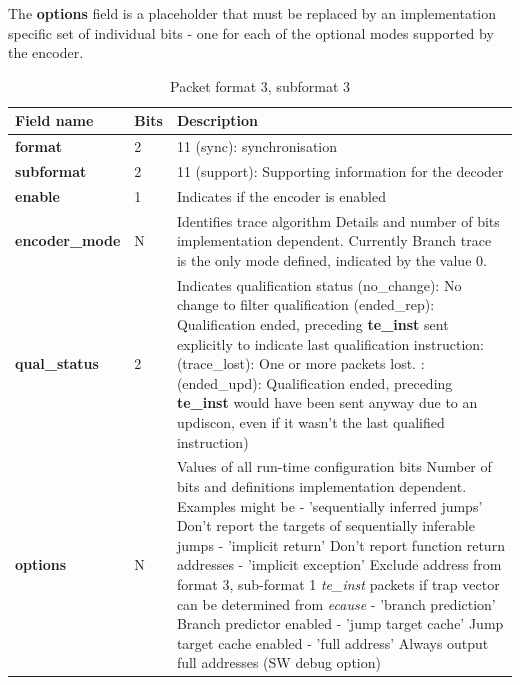 The \textbf{options} field is a placeholder that must be replaced by an implementation specific set of individual bits - one for each of the
optional modes supported by the encoder.

\begin{table}[htp]
  \centering
  \caption{Packet format 3, subformat 3}
  \label{tab:te_inst3-3}
  \begin{tabulary}{\textwidth}{|l|p{35mm}|p{90mm}|}
    \hline
     {\bf Field name} & {\bf Bits} & {\bf Description} \\
     \hline
     \textbf{format} & 2 & 11 (sync): synchronisation\\
     \hline
     \textbf{subformat}  & 2 & 11 (support): Supporting information for the decoder \\
     \hline
     \textbf{enable} & 1 & Indicates if the encoder is enabled\\
     \hline
     \textbf{encoder\_mode} & N & Identifies trace algorithm\newline
       Details and number of bits implementation dependent.  Currently Branch trace is the only mode defined, indicated by the value 0.\\
     \hline
     \textbf{qual\_status} & 2 & Indicates qualification status (no\_change): No change to filter qualification  (ended\_rep): Qualification ended, preceding \textbf{te\_inst} sent explicitly to indicate last qualification instruction: (trace\_lost): One or more packets lost. : (ended\_upd): Qualification ended, preceding \textbf{te\_inst} would have been sent anyway due to an updiscon, even if it wasn't the last qualified instruction)\\
     \hline
     \textbf{options} & N & Values of all run-time configuration bits\newline
       Number of bits and definitions implementation dependent.  Examples might be\newline
       - 'sequentially inferred jumps' Don't report the targets of sequentially inferable jumps\newline
       - 'implicit return' Don't report function return addresses \newline
       - 'implicit exception' Exclude address from format 3, sub-format 1 \textit{te\_inst} packets if trap vector can be determined from \textit{ecause}\newline
       - 'branch prediction' Branch predictor enabled\newline
       - 'jump target cache' Jump target cache enabled\newline
       - 'full address' Always output full addresses (SW debug option)\\
       \hline
  \end{tabulary}
\end{table}


